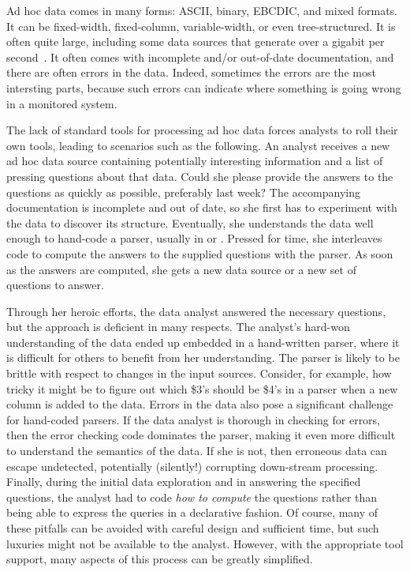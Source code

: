 Ad hoc data comes in many forms: ASCII, binary, EBCDIC, and mixed
formats.  It can be fixed-width, fixed-column, variable-width, or even
tree-structured. It is often quite large, including some data sources
that generate over a gigabit per second~\cite{gigascope}. It often
comes with incomplete and/or out-of-date documentation, and there are
often errors in the data.  Indeed, sometimes the errors are the most
intersting parts, because such errors can indicate where something is
going wrong in a monitored system.

The lack of standard tools for processing ad hoc data forces
analysts to roll their own tools, leading to scenarios such as the
following.  An analyst receives a new ad hoc data source containing
potentially interesting information and a list of pressing questions
about that data.  Could she please provide the answers to the
questions as quickly as possible, preferably last week?  The
accompanying documentation is incomplete and out of date, so she first
has to experiment with the data to discover its structure.  
Eventually, she understands the data well enough to hand-code a
parser, usually in \C{} or \perl{}.  Pressed for time, she interleaves
code to compute the answers to the supplied questions with the parser.
As soon as the answers are computed, she gets a new data source or a
new set of questions to answer.

Through her heroic efforts, the data analyst answered
the necessary questions, but the approach is deficient in many
respects.  
The analyst's hard-won understanding of the data ended up embedded in
a hand-written parser, where it is difficult for others to benefit
from her understanding.
The parser is likely to be brittle with respect to changes in the
input sources.  Consider, for example, how tricky it might be to
figure out which \$3's should be \$4's in a \perl{} parser when a new
column is added to the data.
Errors in the data also pose a significant challenge for hand-coded
parsers.  If the data analyst is thorough in checking for errors, then
the error checking code dominates the parser, making it even more
difficult to understand the semantics of the data.  If she is not,
then erroneous data can escape undetected, potentially (silently!)
corrupting down-stream processing.
Finally, during the initial data exploration and in answering the
specified questions, the analyst had to code \textit{how to compute}
the questions rather than being able to express the queries in a
declarative fashion. 
Of course, many of these pitfalls can be avoided with careful design
and sufficient time, but such luxuries might not be available to the analyst.
However, with the appropriate tool support, many aspects of this
process can be greatly simplified.


